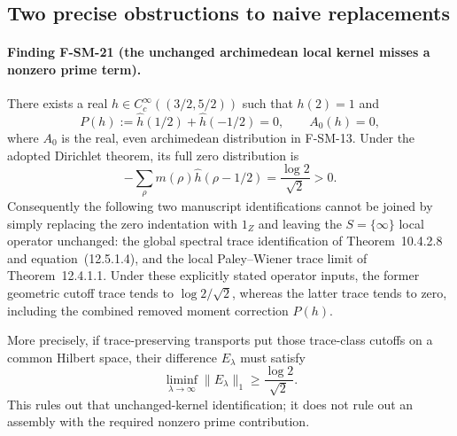 \documentclass[11pt,a4paper]{article}
\theoremstyle{definition}\newtheorem{definition}[theorem]{Definition}
\theoremstyle{remark}\newtheorem{remark}[theorem]{Remark}
\begin{document}
\subsection{Two precise obstructions to naive replacements}

\paragraph{Finding F-SM-21 (the unchanged archimedean local kernel misses a nonzero prime term).}
There exists a real $h\in C_c^\infty((3/2,5/2))$ such that
$h(2)=1$ and
\[
 P(h):=\widehat h(1/2)+\widehat h(-1/2)=0,\qquad A_0(h)=0,
 \tag{SM.21.1}
\]
where $A_0$ is the real, even archimedean distribution in F-SM-13.
Under the adopted Dirichlet theorem, its full zero distribution is
\[
 -\sum_\rho m(\rho)\widehat h(\rho-1/2)
       =\frac{\log2}{\sqrt2}>0.
 \tag{SM.21.2}
\]
Consequently the following two manuscript identifications cannot
be joined by simply replacing the zero indentation with $1_Z$
and leaving the $S=\{\infty\}$ local operator unchanged:
the global spectral trace identification of
Theorem~10.4.2.8 and equation~(12.5.1.4), and the local
Paley--Wiener trace limit of Theorem~12.4.1.1.
Under these explicitly stated operator inputs, the former
geometric cutoff trace tends to $\log2/\sqrt2$, whereas the
latter trace tends to zero, including the combined removed
moment correction $P(h)$.

More precisely, if trace-preserving transports put those
trace-class cutoffs on a common Hilbert space, their difference
$E_\lambda$ must satisfy
\[
 \liminf_{\lambda\to\infty}\|E_\lambda\|_1
       \geq \frac{\log2}{\sqrt2}.
 \tag{SM.21.3}
\]
This rules out that unchanged-kernel identification; it does not
rule out an assembly with the required nonzero prime contribution.
\end{document}
